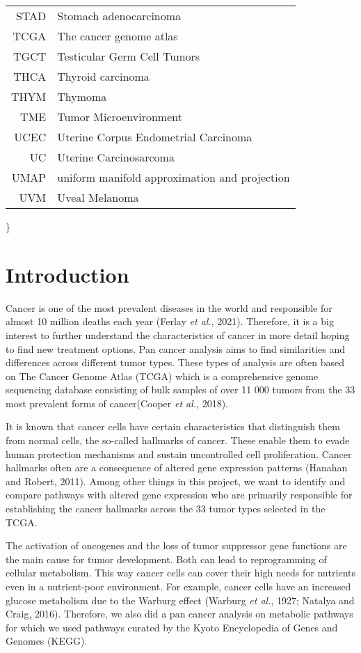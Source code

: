 \documentclass[
  parskip,
  oneside]{scrreprt}
\begin{document}
\begin{tabular}{rl}
      STAD & Stomach adenocarcinoma\\
      TCGA & The cancer genome atlas\\
      TGCT & Testicular Germ Cell Tumors\\
      THCA & Thyroid carcinoma\\
      THYM & Thymoma\\
      TME & Tumor Microenvironment\\
      UCEC & Uterine Corpus Endometrial Carcinoma\\
      UC & Uterine Carcinosarcoma\\
      UMAP & uniform manifold approximation and projection\\
      UVM & Uveal Melanoma\\
        \end{tabular}

\}

\hypertarget{introduction}{%
\chapter{Introduction}\label{introduction}}

Cancer is one of the most prevalent diseases in the world and
responsible for almost 10 million deaths each year (Ferlay \emph{et
al.}, 2021). Therefore, it is a big interest to further understand the
characteristics of cancer in more detail hoping to find new treatment
options. Pan cancer analysis aims to find similarities and differences
across different tumor types. These types of analysis are often based on
The Cancer Genome Atlas (TCGA) which is a comprehensive genome
sequencing database consisting of bulk samples of over 11 000 tumors
from the 33 most prevalent forms of cancer(Cooper \emph{et al.}, 2018).

It is known that cancer cells have certain characteristics that
distinguish them from normal cells, the so-called hallmarks of cancer.
These enable them to evade human protection mechanisms and sustain
uncontrolled cell proliferation. Cancer hallmarks often are a
consequence of altered gene expression patterns (Hanahan and Robert,
2011). Among other things in this project, we want to identify and
compare pathways with altered gene expression who are primarily
responsible for establishing the cancer hallmarks across the 33 tumor
types selected in the TCGA.

The activation of oncogenes and the loss of tumor suppressor gene
functions are the main cause for tumor development. Both can lead to
reprogramming of cellular metabolism. This way cancer cells can cover
their high needs for nutrients even in a nutrient-poor environment. For
example, cancer cells have an increased glucose metabolism due to the
Warburg effect (Warburg \emph{et al.}, 1927; Natalya and Craig, 2016).
Therefore, we also did a pan cancer analysis on metabolic pathways for
which we used pathways curated by the Kyoto Encyclopedia of Genes and
Genomes (KEGG).
\end{document}
